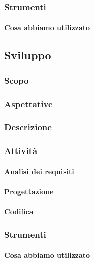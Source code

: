 		\subsubsection{Strumenti}
			\paragraph{Cosa abbiamo utilizzato}
	\subsection{Sviluppo}
		\subsubsection{Scopo}
		\subsubsection{Aspettative}
		\subsubsection{Descrizione}
		\subsubsection{Attività}
			\paragraph{Analisi dei requisiti}
			\paragraph{Progettazione}
			\paragraph{Codifica}
		\subsubsection{Strumenti}
			\paragraph{Cosa abbiamo utilizzato}
		 